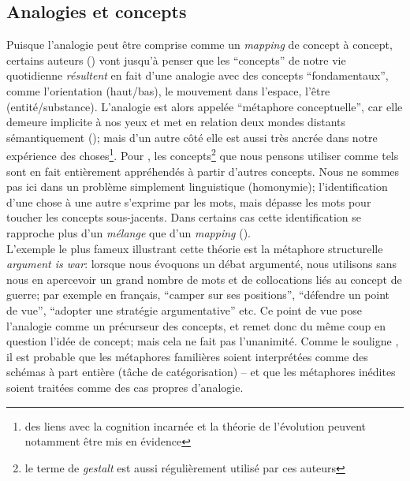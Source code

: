 \documentclass[french]{article}
\begin{document}
		\subsection{Analogies et concepts}
			Puisque l'analogie peut être comprise comme un \textit{mapping} de concept à concept, certains auteurs (\cite{lakoff1980}) vont jusqu'à penser que les ``concepts'' de notre vie quotidienne \textit{résultent} en fait d'une analogie avec des concepts ``fondamentaux'', comme l'orientation (haut/bas), le mouvement dans l'espace, l'être (entité/substance). L'analogie est alors appelée ``métaphore conceptuelle'', car elle demeure implicite à nos yeux et met en relation deux mondes distants sémantiquement (\cite{holyoak2012}); mais d'un autre côté elle est aussi très ancrée dans notre expérience des choses\footnote{des liens avec la cognition incarnée et la théorie de l'évolution peuvent notamment être mis en évidence}. Pour \cite{lakoff1980}, les concepts\footnote{le terme de \textit{gestalt} est aussi régulièrement utilisé par ces auteurs} que nous pensons utiliser comme tels sont en fait entièrement appréhendés à partir d'autres concepts. Nous ne sommes pas ici dans un problème simplement linguistique (homonymie); l'identification d'une chose à une autre s'exprime par les mots, mais dépasse les mots pour toucher les concepts sous-jacents. Dans certains cas cette identification se rapproche plus d'un \textit{mélange} que d'un \textit{mapping} (\cite{holyoak2012}).\\
			
			L'exemple le plus fameux illustrant cette théorie est la métaphore structurelle \textit{argument is war}: lorsque nous évoquons un débat argumenté, nous utilisons sans nous en apercevoir un grand nombre de mots et de collocations liés au concept de guerre; par exemple en français, ``camper sur ses  positions'', ``défendre un point de vue'', ``adopter une stratégie argumentative'' etc.  Ce point de vue pose l'analogie comme un précurseur des concepts, et remet donc du même coup en question l'idée de concept; mais cela ne fait pas l'unanimité. Comme le souligne \cite{holyoak2012}, il est probable que les métaphores familières soient interprétées comme des schémas à part entière (tâche de catégorisation) -- et que les métaphores inédites soient traitées comme des cas propres d'analogie.
\end{document}
